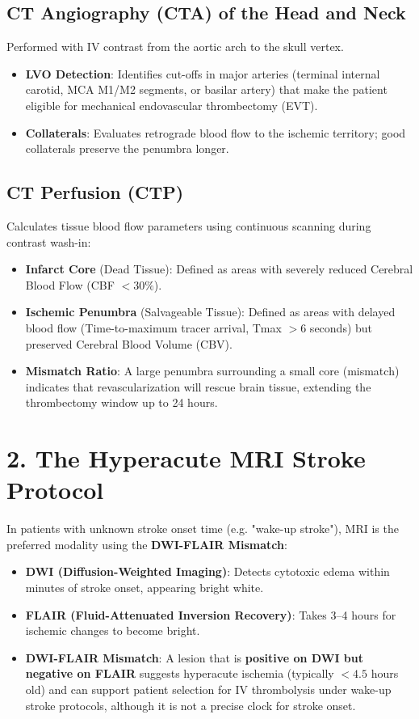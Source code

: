 \subsection*{CT Angiography (CTA) of the Head and Neck}
Performed with IV contrast from the aortic arch to the skull vertex.
\begin{itemize}
    \item \textbf{LVO Detection}: Identifies cut-offs in major arteries (terminal internal carotid, MCA M1/M2 segments, or basilar artery) that make the patient eligible for mechanical endovascular thrombectomy (EVT).
    \item \textbf{Collaterals}: Evaluates retrograde blood flow to the ischemic territory; good collaterals preserve the penumbra longer.
\end{itemize}

\subsection*{CT Perfusion (CTP)}
Calculates tissue blood flow parameters using continuous scanning during contrast wash-in:
\begin{itemize}
    \item \textbf{Infarct Core} (Dead Tissue): Defined as areas with severely reduced Cerebral Blood Flow (CBF $< 30\%$).
    \item \textbf{Ischemic Penumbra} (Salvageable Tissue): Defined as areas with delayed blood flow (Time-to-maximum tracer arrival, Tmax $> 6$ seconds) but preserved Cerebral Blood Volume (CBV).
    \item \textbf{Mismatch Ratio}: A large penumbra surrounding a small core (mismatch) indicates that revascularization will rescue brain tissue, extending the thrombectomy window up to 24 hours.
\end{itemize}


\section*{2. The Hyperacute MRI Stroke Protocol}
In patients with unknown stroke onset time (e.g. "wake-up stroke"), MRI is the preferred modality using the \textbf{DWI-FLAIR Mismatch}:
\begin{itemize}
    \item \textbf{DWI (Diffusion-Weighted Imaging)}: Detects cytotoxic edema within minutes of stroke onset, appearing bright white.
    \item \textbf{FLAIR (Fluid-Attenuated Inversion Recovery)}: Takes 3--4 hours for ischemic changes to become bright.
    \item \textbf{DWI-FLAIR Mismatch}: A lesion that is \textbf{positive on DWI but negative on FLAIR} suggests hyperacute ischemia (typically $< 4.5$ hours old) and can support patient selection for IV thrombolysis under wake-up stroke protocols, although it is not a precise clock for stroke onset.
\end{itemize}


